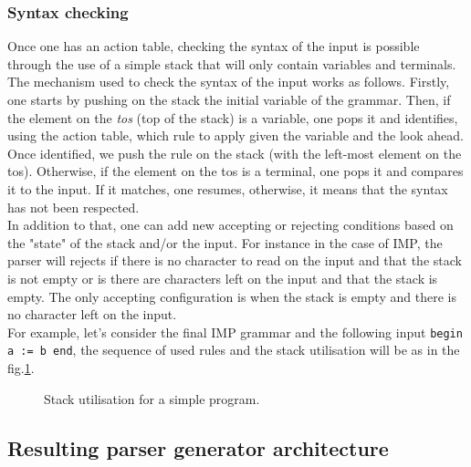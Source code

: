 \documentclass[a4paper,11pt]{article}
\begin{document}
    \subsubsection{Syntax checking}
      Once one has an action table, checking the syntax of the input is possible through the use of a simple stack that will only contain variables and terminals. The mechanism used to check the syntax of the input works as follows. Firstly, one starts by pushing on the stack the initial variable of the grammar. Then, if the element on the \textit{tos} (top of the stack) is a variable, one pops it and identifies, using the action table, which rule to apply given the variable and the look ahead. Once identified, we push the rule on the stack (with the left-most element on the tos). Otherwise, if the element on the tos is a terminal, one pops it and compares it to the input. If it matches, one resumes, otherwise, it means that the syntax has not been respected.\\
      In addition to that, one can add new accepting or rejecting conditions based on the "state" of the stack and/or the input. For instance in the case of IMP, the parser will rejects if there is no character to read on the input and that the stack is not empty or is there are characters left on the input and that the stack is empty. The only accepting configuration is when the stack is empty and there is no character left on the input.\\
      For example, let's consider the final IMP grammar and the following input \verb|begin a := b end|, the sequence of used rules and the stack utilisation will be as in the fig.\ref{fig:simpleprogram}.
      \begin{figure}[h!]
        
        \caption{Stack utilisation for a simple program.}
        \label{fig:simpleprogram}
      \end{figure}
      
  \subsection{Resulting parser generator architecture}
  
\end{document}
